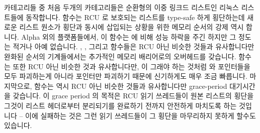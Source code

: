 카테고리들 중 처음 두개의 카테고리들은 순환형의 이중 링크드 리스트인 리눅스
 리스트들에 동작합니다.
 함수는 RCU 로 보호되는 리스트를 type-safe 하게
횡단하는데 새로운 리스트 원소가 횡단과 동시에 삽입되는 상황을 위한 메모리
순서의 강제 역시 합니다.
Alpha 외의 플랫폼들에서, 이 함수는  에 비해 성능
하락을 주긴 하지만 그 정도는 적거나 아예 없습니다.
, , 그리고 
함수들은 RCU 아닌 비슷한 것들과 유사합니다만 완화된 순서의 기계들에서는
추가적인 메모리 배리어로의 오버헤드를 갖습니다.
 함수는 또한 RCU 아닌 비슷한 것과 유사합니다만,
 이 그래야 하는 것처럼  와  포인터들을 모두
파괴하는게 아니라  포인터만 파괴하기 때문에 신기하게도 매우 조금
빠릅니다.
마지막으로,  함수는 역시 RCU 아닌 비슷한 것들과
유사합니다만 grace-period 대기시간을 갖습니다.
이 grace period 의 목적은 RCU 읽기 쓰레드들이 원본 리스트의 횡단을 그것이
리스트 헤더로부터 분리되기를 완료하기 전까지 안전하게 마치도록 하는 것입니다 --
이에 실패하는 것은 그런 읽기 쓰레드들이 그 횡단을 마무리하지 못하게 할수도
있습니다.
\iffalse

The first pair of categories operate on Linux
\co{struct list_head} lists, which are circular, doubly-linked
lists.
The \co{list_for_each_entry_rcu()} primitive traverses an
RCU-protected list in a type-safe manner, while also enforcing
memory ordering for situations where a new list element is inserted
into the list concurrently with traversal.
On non-Alpha platforms, this primitive incurs little or no performance
penalty compared to \co{list_for_each_entry()}.
The \co{list_add_rcu()}, \co{list_add_tail_rcu()},
and \co{list_replace_rcu()} primitives are analogous to
their non-RCU counterparts, but incur the overhead of an additional
memory barrier on weakly-ordered machines.
The \co{list_del_rcu()} primitive is also analogous to its
non-RCU counterpart, but oddly enough is very slightly faster due to the
fact that it poisons only the \co{prev} pointer rather than
both the \co{prev} and \co{next} pointers as
\co{list_del()} must do.
Finally, the \co{list_splice_init_rcu()} primitive is similar
to its non-RCU counterpart, but incurs a full grace-period latency.
The purpose of this grace period is to allow RCU readers to finish
their traversal of the source list before completely disconnecting
it from the list header---failure to do this could prevent such
readers from ever terminating their traversal.
\fi

